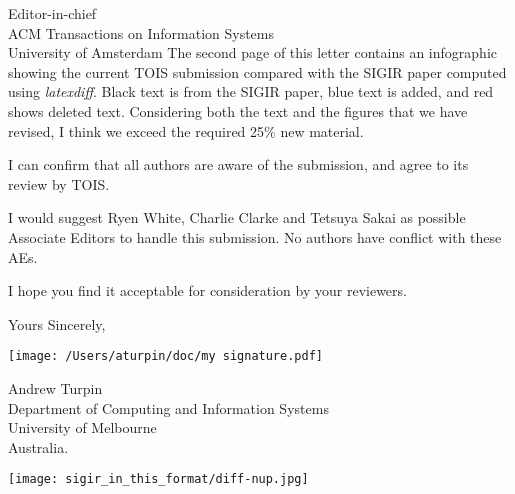 \documentclass{letter}
\begin{document}
\begin{letter}{Editor-in-chief\\ ACM Transactions on Information Systems\\ University of Amsterdam}
The second page of this letter contains an infographic showing the current TOIS
submission compared with the SIGIR paper computed using \emph{latexdiff}.
Black text is from the SIGIR paper, blue text is added, and red shows
deleted text. Considering both the text and the figures that we have revised, I think
we exceed the required 25\% new material.

I can confirm that all authors are aware of the submission, and agree
to its review by TOIS.

I would suggest Ryen White, Charlie Clarke and Tetsuya Sakai as possible Associate
Editors to handle this submission. No authors have conflict with these AEs.

I hope you find it acceptable for consideration by your reviewers.

Yours Sincerely,

\texttt{[image: /Users/aturpin/doc/my signature.pdf]}

Andrew Turpin\\
Department of Computing and Information Systems\\
University of Melbourne\\
Australia.


\newpage
\thispagestyle{empty}
\texttt{[image: sigir\_in\_this\_format/diff-nup.jpg]}


\end{letter}
\end{document}
